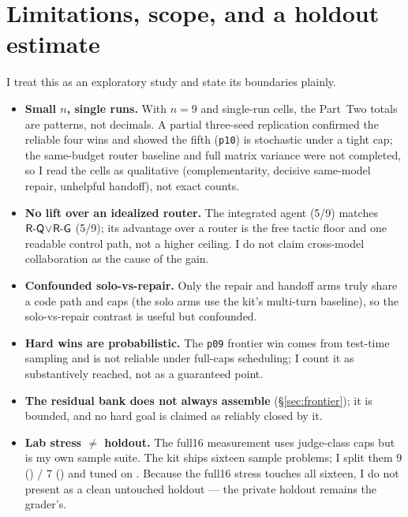 \section{Limitations, scope, and a holdout estimate}
\label{sec:limits}

I treat this as an exploratory study and state its boundaries plainly.
\begin{itemize}
  \item \textbf{Small $n$, single runs.} With $n=9$ and single-run cells, the
        Part~Two totals are patterns, not decimals. A partial three-seed
        replication confirmed the reliable four wins and showed the fifth
        (\texttt{p10}) is stochastic under a tight cap; the same-budget router
        baseline and full matrix variance were not completed, so I read the cells
        as qualitative (complementarity, decisive same-model repair, unhelpful
        handoff), not exact counts.
  \item \textbf{No lift over an idealized router.} The integrated agent (5/9)
        matches $\textsf{R-Q}\!\lor\!\textsf{R-G}$ (5/9); its advantage over a router is the free
        tactic floor and one readable control path, not a higher ceiling. I do not
        claim cross-model collaboration as the cause of the gain.
  \item \textbf{Confounded solo-vs-repair.} Only the repair and handoff arms truly
        share a code path and caps (the solo arms use the kit's multi-turn
        baseline), so the solo-vs-repair contrast is useful but confounded.
  \item \textbf{Hard wins are probabilistic.} The \texttt{p09} frontier win comes
        from test-time sampling and is not reliable under full-caps scheduling; I
        count it as substantively reached, not as a guaranteed point.
  \item \textbf{The residual bank does not always assemble} (\S\ref{sec:frontier});
        it is bounded, and no hard goal is claimed as reliably closed by it.
  \item \textbf{Lab stress $\neq$ holdout.} The full16 measurement uses judge-class
        caps but is my own sample suite. The kit ships sixteen sample problems; I
        split them 9 (\Sdev) / 7 (\Seval) and tuned on \Sdev. Because the full16
        stress touches all sixteen, I do not present \Seval{} as a clean untouched
        holdout --- the private holdout remains the grader's.
\end{itemize}

